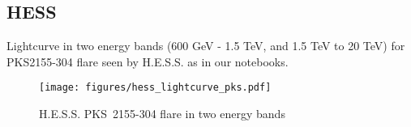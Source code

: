 \subsection{HESS}
\label{ssec:hess}

Lightcurve in two energy bands (600 GeV - 1.5 TeV, and 1.5 TeV to 20 TeV) for
PKS2155-304 flare seen by H.E.S.S. as in our notebooks.

\begin{figure*}[t]
	\centering
	\texttt{[image: figures/hess\_lightcurve\_pks.pdf]}
	\caption{
		H.E.S.S. PKS~2155-304 flare in two energy bands}
	\label{fig:hess_lightcurve_pks} \end{figure*}